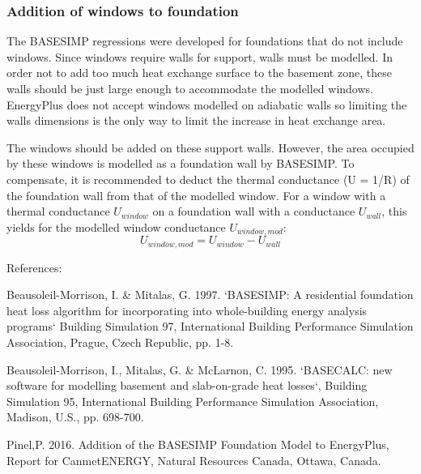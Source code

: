 \subsubsection{Addition of windows to foundation}\label{beaseSimp-windows}

The BASESIMP regressions were developed for foundations that do not include windows.  Since windows require walls for support, walls must be modelled.  In order not to add too much heat exchange surface to the basement zone, these walls should be just large enough to accommodate the modelled windows. EnergyPlus does not accept windows modelled on adiabatic walls so limiting the walls dimensions is the only way to limit the increase in heat exchange area.

The windows should be added on these support walls.  However, the area occupied by these windows is modelled as a foundation wall by BASESIMP.  To compensate, it is recommended to deduct the thermal conductance (U = 1/R) of the foundation wall from that of the modelled window.  For a window with a thermal conductance $U_{window}$ on a foundation wall with a conductance $U_{wall}$, this yields for the modelled window conductance $U_{window,mod}$:
\begin{equation}
U_{window,mod} = U_{window} - U_{wall}
\end{equation}


References:

Beausoleil-Morrison, I. \& Mitalas, G. 1997. `BASESIMP: A residential foundation heat loss algorithm for incorporating into whole-building energy analysis programs` Building Simulation 97, International Building Performance Simulation Association, Prague, Czech Republic, pp. 1-8.

Beausoleil-Morrison, I., Mitalas, G. \& McLarnon, C. 1995. `BASECALC: new software for modelling basement and slab-on-grade heat losses`, Building Simulation 95, International Building Performance Simulation Association, Madison, U.S., pp. 698-700.

Pinel,P. 2016. Addition of the BASESIMP Foundation Model to EnergyPlus, Report for CanmetENERGY, Natural Resources Canada, Ottawa, Canada.
